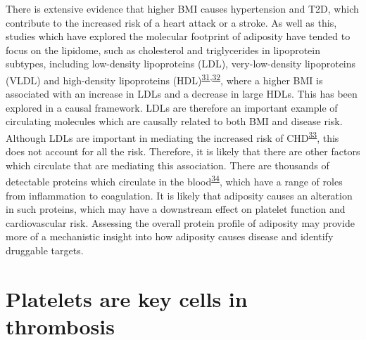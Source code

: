 \documentclass[11pt,twoside]{bristolthesis}
\begin{document}
There is extensive evidence that higher BMI causes hypertension and T2D, which contribute to the increased risk of a heart attack or a stroke. As well as this, studies which have explored the molecular footprint of adiposity have tended to focus on the lipidome, such as cholesterol and triglycerides in lipoprotein subtypes, including low-density lipoproteins (LDL), very-low-density lipoproteins (VLDL) and high-density lipoproteins (HDL)\textsuperscript{\protect\hyperlink{ref-Bell2018a}{31},\protect\hyperlink{ref-Wurtz2014}{32}}, where a higher BMI is associated with an increase in LDLs and a decrease in large HDLs. This has been explored in a causal framework. LDLs are therefore an important example of circulating molecules which are causally related to both BMI and disease risk. Although LDLs are important in mediating the increased risk of CHD\textsuperscript{\protect\hyperlink{ref-Lu2014}{33}}, this does not account for all the risk. Therefore, it is likely that there are other factors which circulate that are mediating this association. There are thousands of detectable proteins which circulate in the blood\textsuperscript{\protect\hyperlink{ref-Sun2018}{34}}, which have a range of roles from inflammation to coagulation. It is likely that adiposity causes an alteration in such proteins, which may have a downstream effect on platelet function and cardiovascular risk. Assessing the overall protein profile of adiposity may provide more of a mechanistic insight into how adiposity causes disease and identify druggable targets.

\hypertarget{platelets-are-key-cells-in-thrombosis}{%
\section{Platelets are key cells in thrombosis}\label{platelets-are-key-cells-in-thrombosis}}
\end{document}
